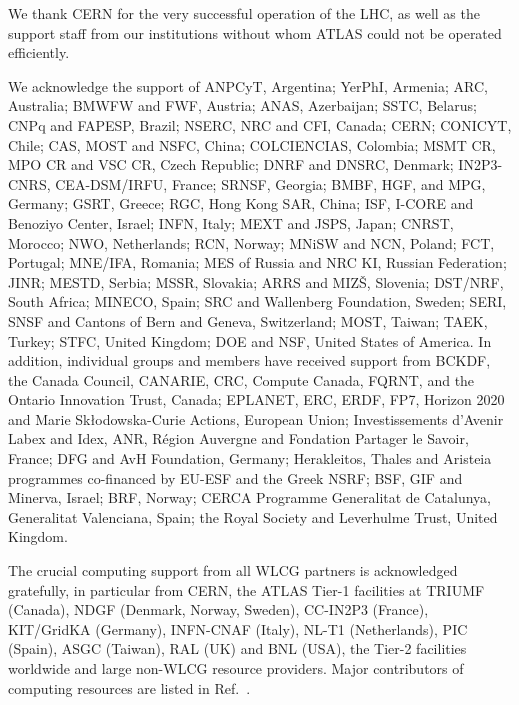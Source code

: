 
We thank CERN for the very successful operation of the LHC, as well as the
support staff from our institutions without whom ATLAS could not be
operated efficiently.

We acknowledge the support of ANPCyT, Argentina; YerPhI, Armenia; ARC, Australia; BMWFW and FWF, Austria; ANAS, Azerbaijan; SSTC, Belarus; CNPq and FAPESP, Brazil; NSERC, NRC and CFI, Canada; CERN; CONICYT, Chile; CAS, MOST and NSFC, China; COLCIENCIAS, Colombia; MSMT CR, MPO CR and VSC CR, Czech Republic; DNRF and DNSRC, Denmark; IN2P3-CNRS, CEA-DSM/IRFU, France; SRNSF, Georgia; BMBF, HGF, and MPG, Germany; GSRT, Greece; RGC, Hong Kong SAR, China; ISF, I-CORE and Benoziyo Center, Israel; INFN, Italy; MEXT and JSPS, Japan; CNRST, Morocco; NWO, Netherlands; RCN, Norway; MNiSW and NCN, Poland; FCT, Portugal; MNE/IFA, Romania; MES of Russia and NRC KI, Russian Federation; JINR; MESTD, Serbia; MSSR, Slovakia; ARRS and MIZ\v{S}, Slovenia; DST/NRF, South Africa; MINECO, Spain; SRC and Wallenberg Foundation, Sweden; SERI, SNSF and Cantons of Bern and Geneva, Switzerland; MOST, Taiwan; TAEK, Turkey; STFC, United Kingdom; DOE and NSF, United States of America. In addition, individual groups and members have received support from BCKDF, the Canada Council, CANARIE, CRC, Compute Canada, FQRNT, and the Ontario Innovation Trust, Canada; EPLANET, ERC, ERDF, FP7, Horizon 2020 and Marie Sk{\l}odowska-Curie Actions, European Union; Investissements d'Avenir Labex and Idex, ANR, R{\'e}gion Auvergne and Fondation Partager le Savoir, France; DFG and AvH Foundation, Germany; Herakleitos, Thales and Aristeia programmes co-financed by EU-ESF and the Greek NSRF; BSF, GIF and Minerva, Israel; BRF, Norway; CERCA Programme Generalitat de Catalunya, Generalitat Valenciana, Spain; the Royal Society and Leverhulme Trust, United Kingdom.

The crucial computing support from all WLCG partners is acknowledged gratefully, in particular from CERN, the ATLAS Tier-1 facilities at TRIUMF (Canada), NDGF (Denmark, Norway, Sweden), CC-IN2P3 (France), KIT/GridKA (Germany), INFN-CNAF (Italy), NL-T1 (Netherlands), PIC (Spain), ASGC (Taiwan), RAL (UK) and BNL (USA), the Tier-2 facilities worldwide and large non-WLCG resource providers. Major contributors of computing resources are listed in Ref.~\cite{ATL-GEN-PUB-2016-002}.

